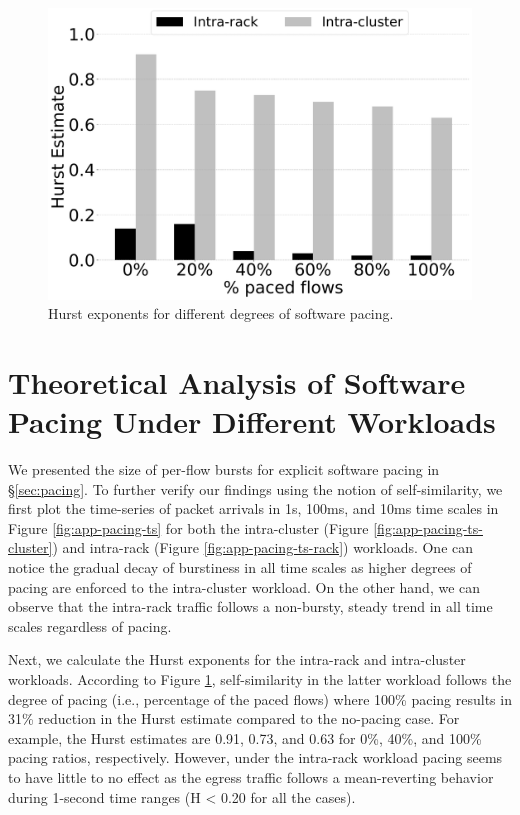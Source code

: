 \begin{figure}[t]
	\centering
	\centering\includegraphics[width=0.65\linewidth]{figs/pacing_hurst_bar.pdf}
    \caption{\small{Hurst exponents for different degrees of software pacing.}}
        \label{fig:app-pacing-hurst}
         \vspace{-2mm}
\end{figure}

\section{Theoretical Analysis of Software Pacing Under Different Workloads}
\label{sec:app-pacing}
We presented the size of per-flow bursts for explicit software pacing in \S\ref{sec:pacing}. To further verify our findings using the notion of self-similarity, we first plot the time-series of packet arrivals in 1s, 100ms, and 10ms time scales in Figure \ref{fig:app-pacing-ts} for both the intra-cluster (Figure \ref{fig:app-pacing-ts-cluster}) and intra-rack (Figure \ref{fig:app-pacing-ts-rack}) workloads. One can notice the gradual decay of burstiness in all time scales as higher degrees of pacing are enforced to the intra-cluster workload. On the other hand, we can observe that the intra-rack traffic follows a non-bursty, steady trend in all time scales regardless of pacing.

Next, we calculate the Hurst exponents for the intra-rack and intra-cluster workloads. According to Figure \ref{fig:app-pacing-hurst}, self-similarity in the latter workload follows the degree of pacing (i.e., percentage of the paced flows) where 100\% pacing results in 31\% reduction in the Hurst estimate compared to the no-pacing case. For example, the Hurst estimates are 0.91, 0.73, and 0.63 for 0\%, 40\%, and 100\% pacing ratios, respectively. However, under the intra-rack workload pacing seems to have little to no effect as the egress traffic follows a mean-reverting behavior during 1-second time ranges (H < 0.20 for all the cases).



